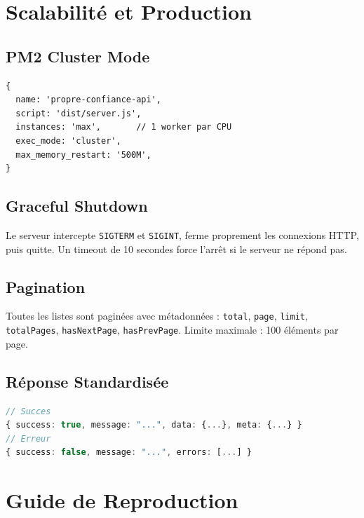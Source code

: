\documentclass[12pt,a4paper]{report}
\begin{document}
\chapter{Scalabilité et Production}

\section{PM2 Cluster Mode}
\begin{lstlisting}[language={},title={ecosystem.config.cjs}]
{
  name: 'propre-confiance-api',
  script: 'dist/server.js',
  instances: 'max',       // 1 worker par CPU
  exec_mode: 'cluster',
  max_memory_restart: '500M',
}
\end{lstlisting}

\section{Graceful Shutdown}
Le serveur intercepte \texttt{SIGTERM} et \texttt{SIGINT}, ferme proprement les connexions HTTP, puis quitte. Un timeout de 10 secondes force l'arrêt si le serveur ne répond pas.

\section{Pagination}
Toutes les listes sont paginées avec métadonnées : \texttt{total}, \texttt{page}, \texttt{limit}, \texttt{totalPages}, \texttt{hasNextPage}, \texttt{hasPrevPage}. Limite maximale : 100 éléments par page.

\section{Réponse Standardisée}
\begin{lstlisting}[language=TypeScript]
// Succes
{ success: true, message: "...", data: {...}, meta: {...} }
// Erreur
{ success: false, message: "...", errors: [...] }
\end{lstlisting}

\chapter{Guide de Reproduction}
\end{document}
